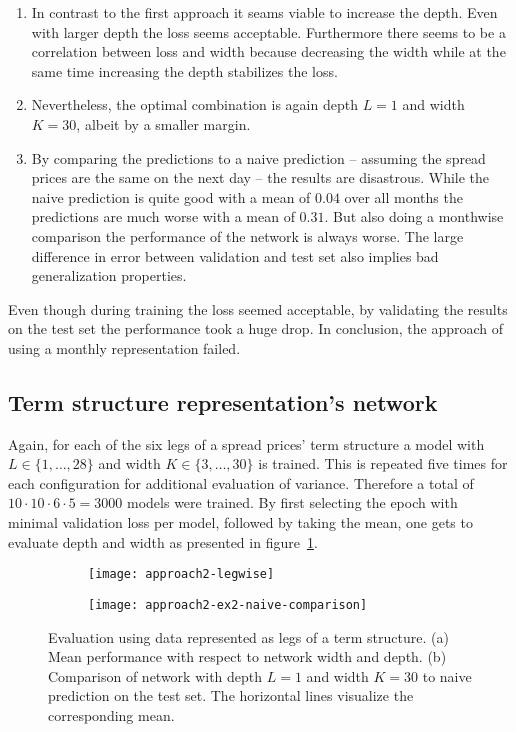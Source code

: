 \begin{enumerate}
	\item In contrast to the first approach it seams viable to increase the depth. Even with larger depth the loss seems acceptable. Furthermore there seems to be a correlation between loss and width because decreasing the width while at the same time increasing the depth stabilizes the loss.
	\item Nevertheless, the optimal combination is again depth $L=1$ and width $K=30$, albeit by a smaller margin.
	\item By comparing the predictions to a naive prediction -- assuming the spread prices are the same on the next day -- the results are disastrous. While the naive prediction is quite good with a mean of $0.04$ over all months the predictions are much worse with a mean of $0.31$. But also doing a monthwise comparison the performance of the network is always worse.
	The large difference in error between validation and test set also implies bad generalization properties.
\end{enumerate}

Even though during training the loss seemed acceptable, by validating the results on the test set the performance took a huge drop. In conclusion, the approach of using a monthly representation failed.

\subsection{Term structure representation's network}

Again, for each of the six legs of a spread prices' term structure a model with $L \in \{1,\dots,28\}$ and width $K \in \{3,\dots, 30\}$ is trained. This is repeated five times for each configuration for additional evaluation of variance. Therefore a total of $10 \cdot 10 \cdot 6 \cdot 5 = 3000$ models were trained. By first selecting the epoch with minimal validation loss per model, followed by taking the mean, one gets to evaluate depth and width as presented in figure~\ref{fig:approach2-ex2}.

\begin{figure}
	\centering
	\begin{subfigure}{0.49\linewidth}
		\texttt{[image: approach2-legwise]}
		\caption{}
	\end{subfigure}
	\begin{subfigure}{0.49\linewidth}
		\texttt{[image: approach2-ex2-naive-comparison]}
		\caption{}
	\end{subfigure}
	\caption[Evaluation using data represented as legs of a term structure]{Evaluation using data represented as legs of a term structure. (a) Mean performance with respect to network width and depth. (b) Comparison of network with depth $L=1$ and width $K=30$ to naive prediction on the test set. The horizontal lines visualize the corresponding mean.}
	\label{fig:approach2-ex2}
\end{figure}

